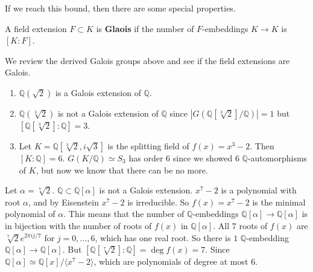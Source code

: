   If we reach this bound, then there are some special properties. 

  \begin{definition}[Galois]
    A field extension $F \subset K$ is \textbf{Glaois} if the number of $F$-embeddings $K \to K$ is $[K:F]$. 
  \end{definition}

  \begin{example}
    We review the derived Galois groups above and see if the field extensions are Galois. 
    \begin{enumerate}
      \item $\mathbb{Q}(\sqrt{2})$ is a Galois extension of $\mathbb{Q}$. 
      \item $\mathbb{Q}(\sqrt[3]{2})$ is not a Galois extension of $\mathbb{Q}$ since $|G(\mathbb{Q}[\sqrt[3]{2}]/\mathbb{Q})| = 1$ but $[\mathbb{Q}[\sqrt[3]{2}] : \mathbb{Q}] = 3$. 
      \item Let $K = \mathbb{Q}[\sqrt[3]{2}, i \sqrt{3}]$ is the splitting field of $f(x) = x^3 - 2$. Then $[K:\mathbb{Q}] = 6$. $G(K/\mathbb{Q}) \simeq S_3$ has order $6$ since we showed 6 $\mathbb{Q}$-automorphisms of $K$, but now we know that there can be no more. 
    \end{enumerate}
  \end{example}

  \begin{example}
    Let $\alpha = \sqrt[7]{2}$. $\mathbb{Q} \subset \mathbb{Q}[\alpha]$ is not a Galois extension. $x^7 - 2$ is a polynomial with root $\alpha$, and by Eisenstein $x^7 - 2$ is irreducible. So $f(x) = x^7 - 2$ is the minimal polynomial of $\alpha$. This means that the number of $\mathbb{Q}$-embeddings $\mathbb{Q}[\alpha] \to \mathbb{Q}[\alpha]$ is in bijection with the number of roots of $f(x)$ in $\mathbb{Q}[\alpha]$. All $7$ roots of $f(x)$ are $\sqrt[7]{2} e^{2\pi i j/7}$ for $j = 0, \ldots, 6$, which has one real root. So there is $1$ $\mathbb{Q}$-embedding $\mathbb{Q}[\alpha] \to \mathbb{Q}[\alpha]$. But $[\mathbb{Q}[\sqrt[7]{2}] : \mathbb{Q}] = \deg{f(x)} = 7$. Since $\mathbb{Q}[\alpha] \simeq \mathbb{Q}[x]/{\langle x^7 - 2 \rangle}$, which are polynomials of degree at most $6$. 
  \end{example}

